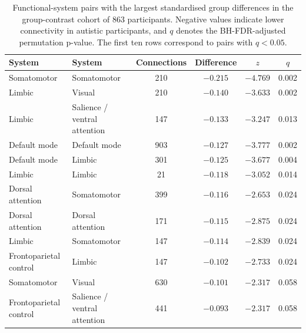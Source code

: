 \begin{table}[t]
\centering
\caption{Functional-system pairs with the largest standardised group differences in the group-contrast cohort of 863 participants. Negative values indicate lower connectivity in autistic participants, and $q$ denotes the BH-FDR-adjusted permutation p-value. The first ten rows correspond to pairs with $q<0.05$.}
\label{tab:system-pairs}
\small
\begin{tabular}{@{}llcccc@{}}
\toprule
System & System & Connections & Difference & $z$ & $q$ \\
\midrule
Somatomotor & Somatomotor & 210 & $-0.215$ & $-4.769$ & 0.002 \\
Limbic & Visual & 210 & $-0.140$ & $-3.633$ & 0.002 \\
Limbic & Salience / ventral attention & 147 & $-0.133$ & $-3.247$ & 0.013 \\
Default mode & Default mode & 903 & $-0.127$ & $-3.777$ & 0.002 \\
Default mode & Limbic & 301 & $-0.125$ & $-3.677$ & 0.004 \\
Limbic & Limbic & 21 & $-0.118$ & $-3.052$ & 0.014 \\
Dorsal attention & Somatomotor & 399 & $-0.116$ & $-2.653$ & 0.024 \\
Dorsal attention & Dorsal attention & 171 & $-0.115$ & $-2.875$ & 0.024 \\
Limbic & Somatomotor & 147 & $-0.114$ & $-2.839$ & 0.024 \\
Frontoparietal control & Limbic & 147 & $-0.102$ & $-2.733$ & 0.024 \\
Somatomotor & Visual & 630 & $-0.101$ & $-2.317$ & 0.058 \\
Frontoparietal control & Salience / ventral attention & 441 & $-0.093$ & $-2.317$ & 0.058 \\
\bottomrule
\end{tabular}
\end{table}

